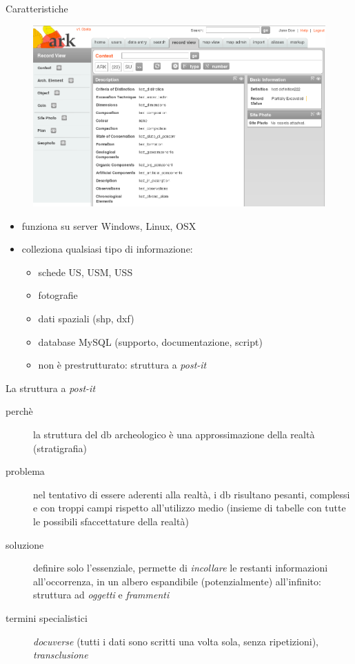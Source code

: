 \documentclass{beamer}
\begin{document}
		\begin{frame}{Caratteristiche}
			\begin{figure}[]
				\begin{center}
					\includegraphics[width=0.7\linewidth]{screen_ark}
				\end{center}
				\label{fig:screen_ark}
			\end{figure}
			\begin{itemize}
				\item funziona su server Windows, Linux, OSX
				\item colleziona qualsiasi tipo di informazione:
					\begin{itemize}
						\item schede US, USM, USS
						\item fotografie
						\item dati spaziali (shp, dxf)
						\item database MySQL (supporto, documentazione, script)
						\item non è prestrutturato: struttura a \emph{post-it}
					\end{itemize}
			\end{itemize}
		\end{frame}

		\begin{frame}{La struttura a \emph{post-it}}
			\begin{description}
				\item[perchè]la struttura del db archeologico è una approssimazione della realtà (stratigrafia)
				\item[problema]nel tentativo di essere aderenti alla realtà, i db risultano pesanti, complessi e con troppi campi rispetto all'utilizzo medio (insieme di tabelle con tutte le possibili sfaccettature della realtà)
				\item[soluzione]definire solo l'essenziale, permette di \emph{incollare} le restanti informazioni all'occorrenza, in un albero espandibile (potenzialmente) all'infinito: struttura ad \emph{oggetti} e \emph{frammenti}
				\item[termini specialistici] \emph{docuverse} (tutti i dati sono scritti una volta sola, senza ripetizioni), \emph{transclusione}
			\end{description}
		\end{frame}
\end{document}
